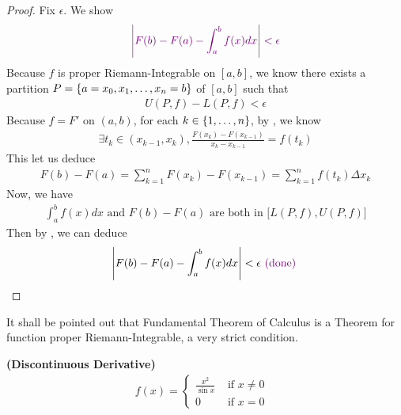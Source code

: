 \documentclass{report}
\begin{document}
\begin{proof}
Fix $\epsilon $. We show 
\begin{align*}
\textcolor{violet}{\text{ $\left|F(b)-F(a)-\int_a^b f(x)dx\right|<\epsilon $ }}
\end{align*}
Because $f$ is proper Riemann-Integrable on $[a,b]$, we know there exists a partition $P=\{ a=x_0,x_1,\dots , x_n=b \}$ of  $[a,b]$ such that 
\begin{align}
\label{FP}
U(P,f)-L(P,f)<\epsilon 
\end{align}
Because $f=F'$ on  $(a,b)$, for each $k \in \{ 1,\dots ,n \}$, by  , we know 
\begin{align*}
\exists t_k \in (x_{k-1},x_k), \frac{F(x_k)-F(x_{k-1})}{x_k-x_{k-1}}=f(t_k)
\end{align*}
This let us deduce
\begin{align*}
F(b)-F(a)=\sum_{k=1}^n F(x_k)-F(x_{k-1})=\sum_{k=1}^n f(t_k) \Delta x_k
\end{align*}
Now, we have 
\begin{align*}
  \int_a^b f(x)dx\text{ and }F(b)-F(a)\text{ are both in }\big[ L(P,f),U(P,f) \big]
\end{align*}
Then by , we can deduce 
\begin{align*}
\left|F(b)-F(a)- \int_a^b f(x)dx\right|<\epsilon \textcolor{violet}{\text{ (done) }}
\end{align*}




\end{proof}
\begin{mdframed}
It shall be pointed out that Fundamental Theorem of Calculus is a Theorem for function proper Riemann-Integrable, a very strict condition. 
\end{mdframed}
\begin{Example}{\textbf{(Discontinuous Derivative)}}{}
\begin{align*}
f(x)=\begin{cases}
  \frac{x^2}{\sin x}& \text{ if $x\neq 0$ }\\
  0& \text{ if $x=0$ }
\end{cases}
\end{align*}
\end{Example}
\end{document}
